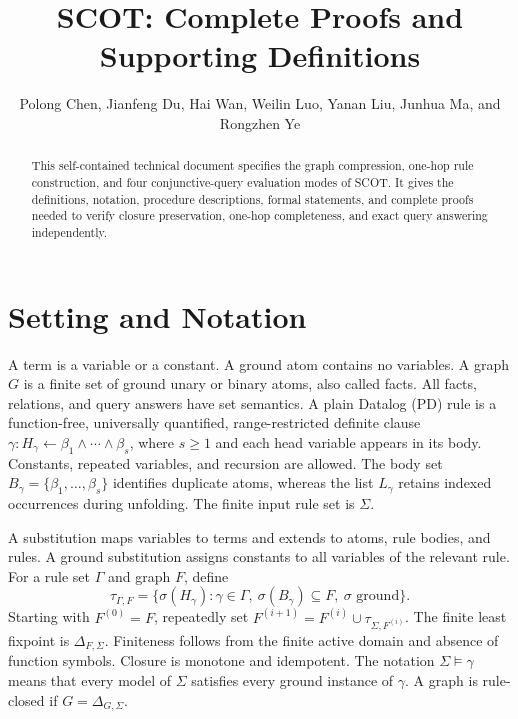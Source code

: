 \documentclass[conference]{IEEEtran}
\theoremstyle{definition}
\newcommand{\Sig}{\Sigma}
\begin{document}
\title{SCOT: Complete Proofs and Supporting Definitions}
\author{Polong Chen, Jianfeng Du, Hai Wan, Weilin Luo, Yanan Liu,
Junhua Ma, and Rongzhen Ye}
\maketitle

\begin{abstract}
This self-contained technical document specifies the graph compression,
one-hop rule construction, and four conjunctive-query evaluation modes of
SCOT. It gives the definitions, notation, procedure descriptions, formal
statements, and complete proofs needed to verify closure preservation,
one-hop completeness, and exact query answering independently.
\end{abstract}

\section{Setting and Notation}
\label{sec:setting}
A term is a variable or a constant. A ground atom contains no variables.
A graph $G$ is a finite set of ground unary or binary atoms, also called
facts. All facts, relations, and query answers have set semantics. A
plain Datalog (PD) rule is a function-free, universally quantified,
range-restricted definite clause
$\gamma:H_\gamma\leftarrow\beta_1\wedge\cdots\wedge\beta_s$,
where $s\geq1$ and each head variable appears in its body. Constants,
repeated variables, and recursion are allowed. The body set
$B_\gamma=\{\beta_1,\ldots,\beta_s\}$ identifies duplicate atoms, whereas
the list $L_\gamma$ retains indexed occurrences during unfolding. The
finite input rule set is $\Sig$.

A substitution maps variables to terms and extends to atoms, rule bodies,
and rules. A ground substitution assigns constants to all variables of
the relevant rule. For a rule set $\Gamma$ and graph $F$, define
\begin{equation}
\label{eq:one-step}
\tau_{\Gamma,F}=\{\sigma(H_\gamma):\gamma\in\Gamma,
\ \sigma(B_\gamma)\subseteq F,\ \sigma\text{ ground}\}.
\end{equation}
Starting with $F^{(0)}=F$, repeatedly set
$F^{(i+1)}=F^{(i)}\cup\tau_{\Sig,F^{(i)}}$.
The finite least fixpoint is $\Delta_{F,\Sig}$. Finiteness follows from
the finite active domain and absence of function symbols. Closure is
monotone and idempotent. The notation $\Sig\models\gamma$ means that
every model of $\Sig$ satisfies every ground instance of $\gamma$.
A graph is rule-closed if $G=\Delta_{G,\Sig}$.
\end{document}
